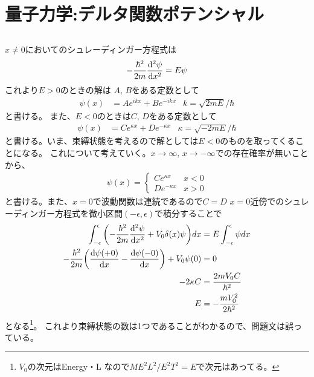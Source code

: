 \documentclass[../../master.tex]{subfiles}
\begin{document}
\chapter{量子力学:デルタ関数ポテンシャル}
\section{}
\(x\neq 0\)においてのシュレーディンガー方程式は
\begin{align}
    -\frac{\hbar^2}{2m}\dv[2]{\psi}{x} = E\psi
\end{align}
これより\(E>0\)のときの解は
\(A,\,B\)をある定数として
\begin{align}
    \psi(x) &= Ae^{ikx}+Be^{-ikx} & k = \sqrt{2mE}/\hbar
\end{align}
と書ける。
また、\(E<0\)のときは\(C,\,D\)をある定数として
\begin{align}
    \psi(x) &= Ce^{\kappa x} + De^{-\kappa x}& \kappa = \sqrt{-2mE}/\hbar
\end{align}
と書ける。いま、束縛状態を考えるので解としては\(E<0\)のものを取ってくることになる。
これについて考えていく。\(x\to\infty,\,x\to-\infty\)での存在確率が無いことから、
\begin{align}
    \psi(x) =\begin{cases}
        Ce^{\kappa x} & x<0\\
        De^{-\kappa x} & x>0
    \end{cases}
\end{align}
と書ける。また、\(x=0\)で波動関数は連続であるので\(C=D\)
\(x=0\)近傍でのシュレーディンガー方程式を微小区間\((-\epsilon,\epsilon)\)で積分することで
\begin{align}
    \int_{-\epsilon}^{\epsilon}\qty(-\frac{\hbar^2}{2m}\dv[2]{\psi}{x} +V_0\delta(x)\psi)dx &= E \int_{-\epsilon}^{\epsilon} \psi dx\\
    -\frac{\hbar^2}{2m}\qty(\dv{\psi(+0)}{x}-\dv{\psi(-0)}{x}) +V_0\psi(0) &= 0\\
    -2\kappa C &= \frac{2mV_0 C}{\hbar^2}\\
    E &= -\frac{m V_0^2}{2\hbar^2}
\end{align}
となる\footnote{\(V_0\)の次元はEnergy・L なので\(ME^2L^2/E^2T^2=E\)で次元はあってる。}。
これより束縛状態の数は1つであることがわかるので、問題文は誤っている。
\end{document}
